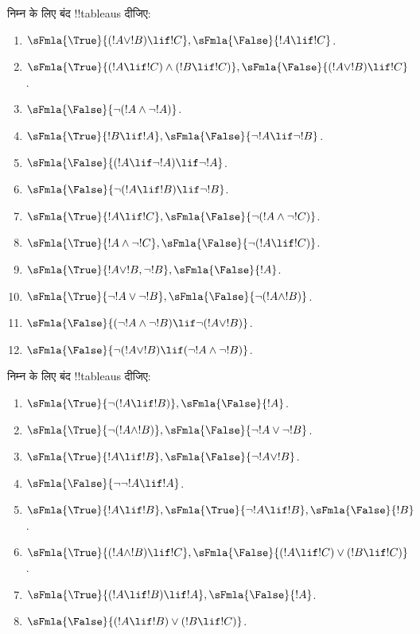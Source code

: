 \documentclass[../../../include/open-logic-section]{subfiles}
\begin{document}
\begin{prob}
निम्न के लिए बंद !!{tableau}s दीजिए:
\begin{enumerate}
\item $\sFmla{\True}{(!A \lor !B) \lif !C}, \sFmla{\False}{!A \lif !C}$.
\item $\sFmla{\True}{(!A \lif !C) \land (!B \lif !C)}, \sFmla{\False}{(!A \lor !B) \lif !C}$.
\item $\sFmla{\False}{\lnot(!A \land \lnot !A)}$.
\item $\sFmla{\True}{!B \lif !A}, \sFmla{\False}{\lnot !A \lif \lnot !B}$.
\item $\sFmla{\False}{(!A \lif \lnot !A) \lif \lnot !A}$.
\item $\sFmla{\False}{\lnot(!A \lif !B) \lif \lnot !B}$.
\item $\sFmla{\True}{!A \lif !C}, \sFmla{\False}{\lnot (!A \land \lnot !C)}$.
\item $\sFmla{\True}{!A \land \lnot !C}, \sFmla{\False}{\lnot (!A \lif !C)}$.
\item $\sFmla{\True}{!A \lor !B, \lnot !B}, \sFmla{\False}{!A}$.
\item $\sFmla{\True}{\lnot !A \lor \lnot !B}, \sFmla{\False}{\lnot(!A \land !B)}$.
\item $\sFmla{\False}{(\lnot !A \land \lnot !B) \lif\lnot(!A \lor !B)}$.
\item $\sFmla{\False}{\lnot(!A \lor !B) \lif (\lnot !A \land \lnot !B)}$.
\end{enumerate}
\end{prob}

\begin{prob}
निम्न के लिए बंद !!{tableau}s दीजिए:
\begin{enumerate}
\item $\sFmla{\True}{\lnot(!A \lif !B)}, \sFmla{\False}{!A}$.
\item $\sFmla{\True}{\lnot(!A \land !B)}, \sFmla{\False}{\lnot !A \lor \lnot !B}$.
\item $\sFmla{\True}{!A \lif !B}, \sFmla{\False}{\lnot !A \lor !B}$.
\item $\sFmla{\False}{\lnot \lnot !A \lif !A}$.
\item $\sFmla{\True}{!A \lif !B}, \sFmla{\True}{\lnot !A \lif !B}, \sFmla{\False}{!B}$.
\item $\sFmla{\True}{(!A \land !B) \lif !C}, \sFmla{\False}{(!A \lif !C) \lor (!B \lif !C)}$.
\item $\sFmla{\True}{(!A \lif !B) \lif !A}, \sFmla{\False}{!A}$.
\item $\sFmla{\False}{(!A \lif !B) \lor (!B \lif !C)}$.
\end{enumerate}
\end{prob}
\end{document}
